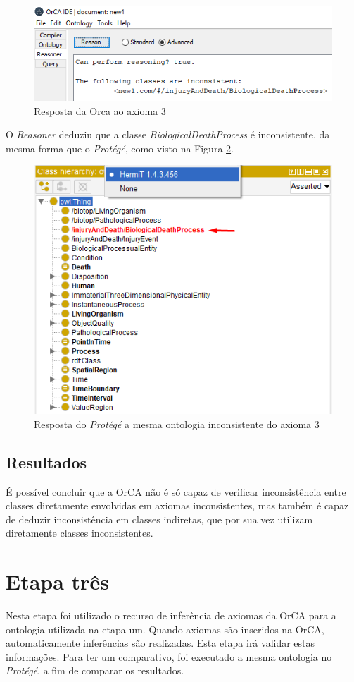 \documentclass{bcc}
\begin{document}
\begin{figure}[H]
\centering
\includegraphics[width=.6\textwidth]{Figuras/axiomai_3_res.png}
\caption{Resposta da Orca ao axioma 3} 
\label{fig:axiomai_3_res}
\end{figure}

O \textit{Reasoner} deduziu que a classe \textit{BiologicalDeathProcess} é inconsistente, da mesma forma que o \textit{Protégé}, como visto na Figura \ref{fig:axiomai_3_protege}.

\begin{figure}[H]
\centering
\includegraphics[width=.5\textwidth]{Figuras/axiomai_3_protege.png}
\caption{Resposta do \textit{Protégé} a mesma ontologia inconsistente do axioma 3} 
\label{fig:axiomai_3_protege}
\end{figure}

\subsection{Resultados}
É possível concluir que a OrCA não é só capaz de verificar inconsistência entre classes diretamente envolvidas em axiomas inconsistentes, mas também é capaz de deduzir inconsistência em classes indiretas, que por sua vez utilizam diretamente classes inconsistentes.

\section{Etapa três}
Nesta etapa foi utilizado o recurso de inferência de axiomas da OrCA para a ontologia utilizada na etapa um. Quando axiomas são inseridos na OrCA, automaticamente inferências são realizadas. Esta etapa irá validar estas informações. Para ter um comparativo, foi executado a mesma ontologia no \textit{Protégé}, a fim de comparar os resultados.
\end{document}
